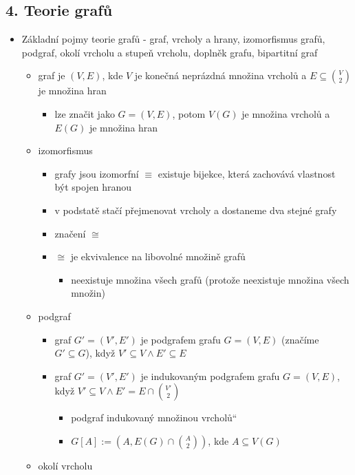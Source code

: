 \subsection{4. Teorie grafů}
\begin{itemize}
\item Základní pojmy teorie grafů - graf, vrcholy a hrany, izomorfismus grafů, podgraf, okolí vrcholu a stupeň vrcholu, doplněk grafu, bipartitní graf
\begin{itemize}
\item graf je $(V, E)$, kde $V$ je konečná neprázdná množina vrcholů a $E \subseteq {V \choose 2}$ je množina hran
\begin{itemize}
\item lze značit jako $G=(V,E)$, potom $V(G)$ je množina vrcholů a $E(G)$ je množina hran
\end{itemize}
\item izomorfismus
\begin{itemize}
\item grafy jsou izomorfní $\equiv$ existuje bijekce, která zachovává vlastnost být spojen hranou
\item v podstatě stačí přejmenovat vrcholy a dostaneme dva stejné grafy
\item značení $\cong$
\item $\cong$ je ekvivalence na libovolné množině grafů
\begin{itemize}
\item neexistuje množina všech grafů (protože neexistuje množina všech množin)
\end{itemize}
\end{itemize}
\item podgraf
\begin{itemize}
\item graf $G'=(V',E')$ je podgrafem grafu $G=(V,E)$ (značíme $G'\subseteq G$), když $V'\subseteq V \land E'\subseteq E$
\item graf $G'=(V',E')$ je indukovaným podgrafem grafu $G=(V,E)$, když $V'\subseteq V \land E'= E\cap {V'\choose 2}$
\begin{itemize}
\item \quotedblbase{}podgraf indukovaný množinou vrcholů\textquotedblleft{}
\item $G[A] := (A, E(G) \cap {A \choose 2})$, kde $A\subseteq V(G)$
\end{itemize}
\end{itemize}
\item okolí vrcholu
\begin{itemize}

\end{itemize}
\end{itemize}
\end{itemize}
